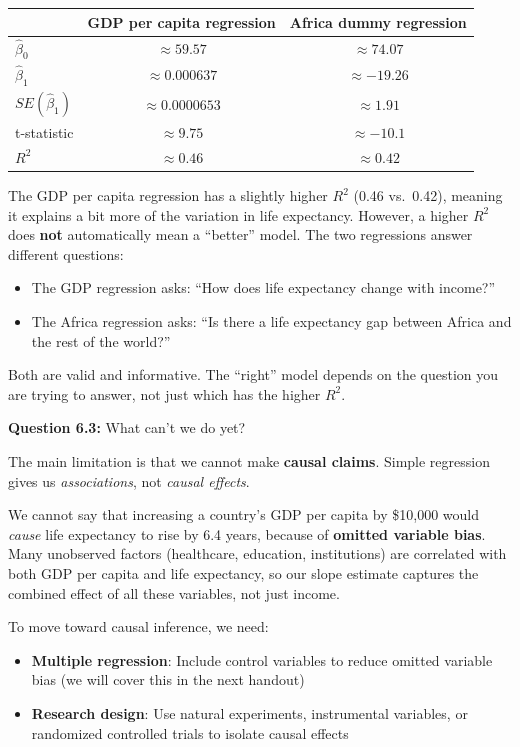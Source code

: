 \documentclass[11pt,letterpaper]{article}
\begin{document}
\begin{answer}
\begin{center}
\begin{tabular}{l|c|c}
\toprule
 & GDP per capita regression & Africa dummy regression \\
\midrule
$\hat{\beta}_0$ & $\approx 59.57$ & $\approx 74.07$ \\[4pt]
$\hat{\beta}_1$ & $\approx 0.000637$ & $\approx -19.26$ \\[4pt]
$SE(\hat{\beta}_1)$ & $\approx 0.0000653$ & $\approx 1.91$ \\[4pt]
t-statistic & $\approx 9.75$ & $\approx -10.1$ \\[4pt]
$R^2$ & $\approx 0.46$ & $\approx 0.42$ \\
\bottomrule
\end{tabular}
\end{center}

The GDP per capita regression has a slightly higher $R^2$ (0.46 vs.\ 0.42), meaning it explains a bit more of the variation in life expectancy. However, a higher $R^2$ does \textbf{not} automatically mean a ``better'' model. The two regressions answer different questions:

\begin{itemize}[noitemsep]
\item The GDP regression asks: ``How does life expectancy change with income?''
\item The Africa regression asks: ``Is there a life expectancy gap between Africa and the rest of the world?''
\end{itemize}

Both are valid and informative. The ``right'' model depends on the question you are trying to answer, not just which has the higher $R^2$.
\end{answer}

\textbf{Question 6.3:} What can't we do yet?

\begin{answer}
The main limitation is that we cannot make \textbf{causal claims}. Simple regression gives us \textit{associations}, not \textit{causal effects}.

We cannot say that increasing a country's GDP per capita by \$10,000 would \textit{cause} life expectancy to rise by 6.4 years, because of \textbf{omitted variable bias}. Many unobserved factors (healthcare, education, institutions) are correlated with both GDP per capita and life expectancy, so our slope estimate captures the combined effect of all these variables, not just income.

To move toward causal inference, we need:
\begin{itemize}[noitemsep]
\item \textbf{Multiple regression}: Include control variables to reduce omitted variable bias (we will cover this in the next handout)
\item \textbf{Research design}: Use natural experiments, instrumental variables, or randomized controlled trials to isolate causal effects
\end{itemize}
\end{answer}
\end{document}
